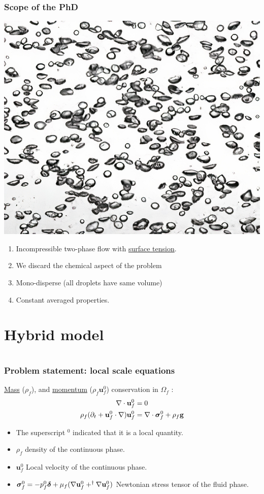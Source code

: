 \documentclass{sintefbeamer}
\begin{document}
\begin{frame}
  \frametitle{Scope of the PhD}
  \centering
  \includegraphics[height=0.3\textwidth]{image/bubbles_4x.jpg}

  \begin{enumerate}
    \item Incompressible two-phase flow with \underline{surface tension}. 
    \item We discard the chemical aspect of the problem 
    \item Mono-disperse (all droplets have same volume)
    \item Constant averaged properties.   
  \end{enumerate}
  
\end{frame}


\section{Hybrid model}
\section*{}



\begin{frame}
  \frametitle{Problem statement: local scale equations}
  \underline{Mass} ($\rho_f$), and \underline{momentum} ($\rho_f \textbf{u}_f^0$) conservation in $\Omega_f$ :
\begin{align}
  \mathbf{\nabla}\cdot  \textbf{u}_f^0
  &= 
  0
  \\
  \rho_f (\partial_t  + \textbf{u}_f^0 \cdot \mathbf{\nabla})
  \textbf{u}_f^0  
  &= 
  \mathbf{\nabla}\cdot  \bm{\sigma}_f^0 
  + \rho_f \textbf{g}
\end{align}
\begin{itemize}
    \item The superscript $^0$ indicated that it is a local quantity.
    \item $\rho_f$  density of the continuous phase. 
    \item $\textbf{u}_f^0$ Local velocity of the continuous phase.
    \item $\bm\sigma_f^0 = -p_f^0 \bm\delta + \mu_f (\mathbf{\nabla} \textbf{u}_f^0+^\dagger\mathbf{\nabla} \textbf{u}_f^0)$ Newtonian stress tensor of the fluid phase. 
\end{itemize}
\end{frame}
\end{document}
